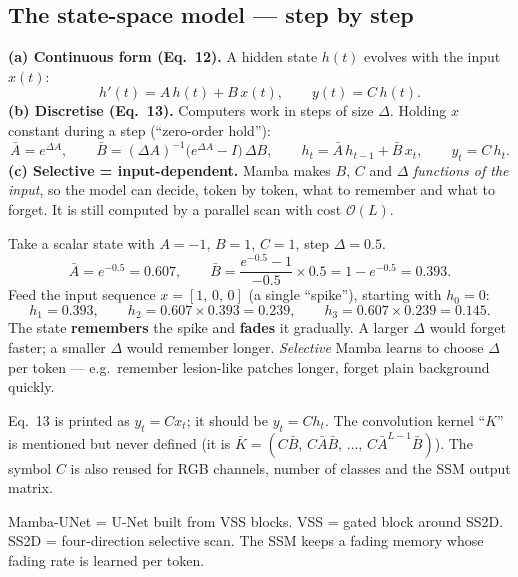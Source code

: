 \documentclass[11pt,a4paper]{article}
\begin{document}
\subsection{The state-space model --- step by step}
\textbf{(a) Continuous form (Eq.~12).} A hidden state $h(t)$ evolves with the input $x(t)$:
\[
h'(t) = A\,h(t) + B\,x(t),\qquad y(t) = C\,h(t).
\]
\textbf{(b) Discretise (Eq.~13).} Computers work in steps of size $\Delta$. Holding $x$ constant during
a step (``zero-order hold''):
\[
\bar A = e^{\Delta A},\qquad \bar B = (\Delta A)^{-1}\big(e^{\Delta A}-I\big)\,\Delta B,\qquad
h_t=\bar A\,h_{t-1}+\bar B\,x_t,\qquad y_t = C\,h_t .
\]
\textbf{(c) Selective = input-dependent.} Mamba makes $B$, $C$ and $\Delta$ \emph{functions of the
input}, so the model can decide, token by token, what to remember and what to forget. It is still
computed by a parallel scan with cost $\mathcal{O}(L)$.

\begin{worked}
Take a scalar state with $A=-1$, $B=1$, $C=1$, step $\Delta=0.5$.
\[
\bar A = e^{-0.5}=0.607,\qquad \bar B=\frac{e^{-0.5}-1}{-0.5}\times 0.5 = 1-e^{-0.5}=0.393 .
\]
Feed the input sequence $x=[1,\,0,\,0]$ (a single ``spike''), starting with $h_0=0$:
\[
h_1=0.393,\qquad h_2=0.607\times0.393=0.239,\qquad h_3=0.607\times0.239=0.145 .
\]
The state \textbf{remembers} the spike and \textbf{fades} it gradually. A larger $\Delta$ would forget
faster; a smaller $\Delta$ would remember longer. \emph{Selective} Mamba learns to choose $\Delta$ per
token --- e.g.\ remember lesion-like patches longer, forget plain background quickly.
\end{worked}

\begin{careful}
Eq.~13 is printed as $y_t=Cx_t$; it should be $y_t=Ch_t$. The convolution kernel ``$K$'' is mentioned
but never defined (it is $\bar K = (C\bar B,\,C\bar A\bar B,\,\dots,\,C\bar A^{L-1}\bar B)$). The
symbol $C$ is also reused for RGB channels, number of classes and the SSM output matrix.
\end{careful}

\begin{recap}
Mamba-UNet = U-Net built from VSS blocks. VSS = gated block around SS2D. SS2D = four-direction
selective scan. The SSM keeps a fading memory whose fading rate is learned per token.
\end{recap}

\end{document}
